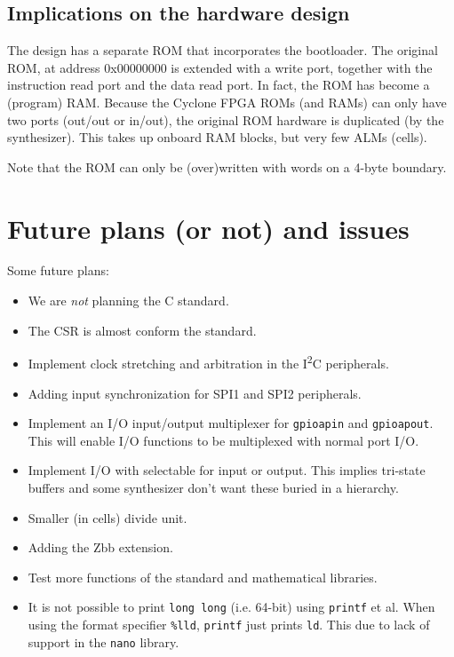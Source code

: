 \documentclass[12pt]{article}
\begin{document}
\subsection{Implications on the hardware design}
The design has a separate ROM that incorporates the bootloader. The original ROM, at address 0x00000000 is extended with a write port, together with the instruction read port and the data read port. In fact, the ROM has become a (program) RAM. Because the Cyclone FPGA ROMs (and RAMs) can only have two ports (out/out or in/out), the original ROM hardware is duplicated (by the synthesizer). This takes up onboard RAM blocks, but very few ALMs (cells). %

Note that the ROM can only be (over)written with words on a 4-byte boundary.

\section{Future plans (or not) and issues}
Some future plans:

\begin{itemize}
\item We are \emph{not} planning the C standard.
\item The CSR is almost conform the standard.
\item Implement clock stretching and arbitration in the I\textsuperscript{2}C peripherals.
\item Adding input synchronization for SPI1 and SPI2 peripherals.
\item Implement an I/O input/output multiplexer for \lstinline|gpioapin| and \lstinline|gpioapout|. This will enable I/O functions to be multiplexed with normal port I/O.
\item Implement I/O with selectable for input or output. This implies tri-state buffers and some synthesizer don't want these buried in a hierarchy.
\item Smaller (in cells) divide unit.
\item Adding the Zbb extension.
\item Test more functions of the standard and mathematical libraries.
\item It is not possible to print \lstinline|long long| (i.e. 64-bit) using \lstinline|printf| et al. When using the format specifier \lstinline|%lld|, \lstinline|printf| just prints \lstinline|ld|. This due to lack of support in the \lstinline|nano| library.

\end{itemize}
\end{document}
